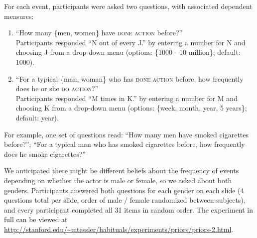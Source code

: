 \documentclass[10pt,letterpaper]{article}
\newcommand{\ndg}[1]{\textcolor{Green}{[ndg: #1]}}
\begin{document}
For each event, participants were asked two questions, with associated dependent measures:
\begin{enumerate}
\itemsep0em%
\item ``How many \{men, women\} have \textsc{done action} before?'' \\
Participants responded ``N out of every J.'' by entering a number for N and choosing J from a drop-down menu (options: \{1000 - 10 million\}; default: 1000).
% 
\item ``For a typical \{man, woman\} who has \textsc{done action}  before, how frequently does he or she \textsc{do action}?''\\  
Participants responded ``M times in K.'' by entering a number for M and choosing K from a drop-down menu (options: \{week, month, year, 5 years\}; default: year).
%
\end{enumerate}
For example, one set of questions read: ``How many men have smoked cigarettes before?''; ``For a typical man who has smoked cigarettes before, how frequently does he smoke cigarettes?''

We anticipated there might be different beliefs about the frequency of events depending on whether the actor is male or female, so we asked about both genders. Participants answered both questions for each gender on each slide (4 questions total per slide, order of male / female randomized between-subjects), and every participant completed all 31 items in random order.
The experiment in full can be viewed at \url{http://stanford.edu/~mtessler/habituals/experiments/priors/priors-2.html}.
\end{document}
